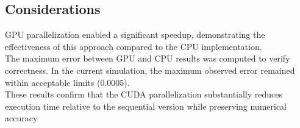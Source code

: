 \newpage
\subsection{Considerations}
GPU parallelization enabled a significant speedup, demonstrating the effectiveness of this approach compared to the CPU implementation.\\

\noindent
The maximum error between GPU and CPU results was computed to verify correctness. In the current simulation, the maximum observed error remained within acceptable limits (0.0005).\\

\noindent
These results confirm that the CUDA parallelization substantially reduces execution time relative to the sequential version while preserving numerical accuracy